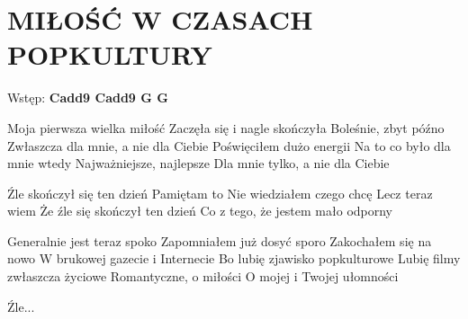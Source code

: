 \documentclass[../../../songbook.tex]{subfiles}
\begin{document}
\TabPositions{8cm} %
\section*{MIŁOŚĆ W CZASACH POPKULTURY}
{}
\vspace{0.5cm}
Wstęp: {\color{red}\textbf{Cadd9 Cadd9 G G} } \newline

Moja pierwsza wielka miłość				 \newline
Zaczęła się i nagle skończyła			 \newline
Boleśnie, zbyt późno					 \newline
Zwłaszcza dla mnie, a nie dla Ciebie			 \newline
Poświęciłem dużo energii				 \newline
Na to co było dla mnie wtedy			 \newline
Najważniejsze, najlepsze				 \newline
Dla mnie tylko, a nie dla Ciebie		 \newline

\-\hspace{1cm} Źle skończył się ten dzień	 \newline
\-\hspace{1cm} Pamiętam to					 \newline
\-\hspace{1cm} Nie wiedziałem czego chcę	 \newline
\-\hspace{1cm} Lecz teraz wiem			 \newline
\-\hspace{1cm} Że źle się skończył ten dzień			 \newline
\-\hspace{1cm} Co z tego, że jestem mało odporny			 \newline

Generalnie jest teraz spoko			 \newline
Zapomniałem już dosyć sporo			 \newline
Zakochałem się na nowo			 \newline
W brukowej gazecie i Internecie			 \newline
Bo lubię zjawisko popkulturowe			 \newline
Lubię filmy zwłaszcza życiowe			 \newline
Romantyczne, o miłości			 \newline
O mojej i Twojej ułomności			 \newline

\-\hspace{1cm} Źle...			 \newline
\end{document}
